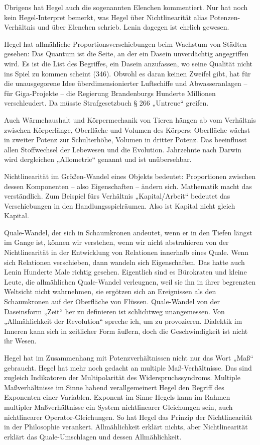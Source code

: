 \documentclass[11pt,a4paper]{article}
\begin{document}
Übrigens hat Hegel auch die sogenannten Elenchen kommentiert. Nur hat noch
kein Hegel-Interpret bemerkt, was Hegel über Nichtlinearität alias
Potenzen-Verhältnis und über Elenchen schrieb. Lenin dagegen ist ehrlich
gewesen.

Hegel hat allmähliche Proportionsverschiebungen beim Wachstum von Städten
gesehen: Das Quantum ist die Seite, an der ein Dasein unverdächtig angegriffen
wird. Es ist die List des Begriffes, ein Dasein anzufassen, wo seine Qualität
nicht ins Spiel zu kommen scheint (346). Obwohl es daran keinen Zweifel gibt,
hat für die unausgegorene Idee überdimensionierter Luftschiffe und
Abwasseranlagen – für Giga-Projekte -- die Regierung Brandenburgs Hunderte
Millionen verschleudert. Da müsste Strafgesetzbuch § 266 „Untreue“ greifen.

Auch Wärmehaushalt und Körpermechanik von Tieren hängen ab vom Verhältnis
zwischen Körperlänge, Oberfläche und Volumen des Körpers: Oberfläche wächst in
zweiter Potenz zur Schulterhöhe, Volumen in dritter Potenz. Das beeinflusst
allen Stoffwechsel der Lebewesen und die Evolution. Jahrzehnte nach Darwin
wird dergleichen „Allometrie“ genannt und ist unübersehbar.

Nichtlinearität im Größen-Wandel eines Objekts bedeutet: Proportionen zwischen
dessen Komponenten – also Eigenschaften -- ändern sich. Mathematik macht das
verständlich. Zum Beispiel fürs Verhältnis „Kapital/Arbeit“ bedeutet das
Verschiebungen in den Handlungsspielräumen. Also ist Kapital nicht gleich
Kapital.

Quale-Wandel, der sich in Schaumkronen andeutet, wenn er in den Tiefen längst
im Gange ist, können wir verstehen, wenn wir nicht abstrahieren von der
Nichtlinearität in der Entwicklung von Relationen innerhalb eines Quale. Wenn
sich Relationen verschieben, dann wandeln sich Eigenschaften. Das hatte auch
Lenin Hunderte Male richtig gesehen. Eigentlich sind es Bürokraten und kleine
Leute, die allmählichen Quale-Wandel verleugnen, weil sie ihn in ihrer
begrenzten Weltsicht nicht wahrnehmen, sie ergötzen sich an Ereignissen als
den Schaumkronen auf der Oberfläche von Flüssen. Quale-Wandel von der
Daseinsform „Zeit“ her zu definieren ist schlichtweg unangemessen. Von
„Allmählichkeit der Revolution“ spreche ich, um zu provozieren. Dialektik im
Inneren kann sich in zeitlicher Form äußern, doch die Geschwindigkeit ist
nicht ihr Wesen.

Hegel hat im Zusammenhang mit Potenzverhältnissen nicht nur das Wort „Maß“
gebraucht. Hegel hat mehr noch gedacht an multiple Maß-Verhältnisse. Das sind
zugleich Indikatoren der Multipolarität des Widerspruchssyndroms. Multiple
Maßverhältnisse im Sinne habend verallgemeinert Hegel den Begriff des
Exponenten einer Variablen. Exponent im Sinne Hegels kann im Rahmen multipler
Maßverhältnisse ein System nichtlinearer Gleichungen sein, auch nichtlinearer
Operator-Gleichungen. So hat Hegel das Prinzip der Nichtlinearität in der
Philosophie verankert. Allmählichkeit erklärt nichts, aber Nichtlinearität
erklärt das Quale-Umschlagen und dessen Allmählichkeit.
\end{document}
